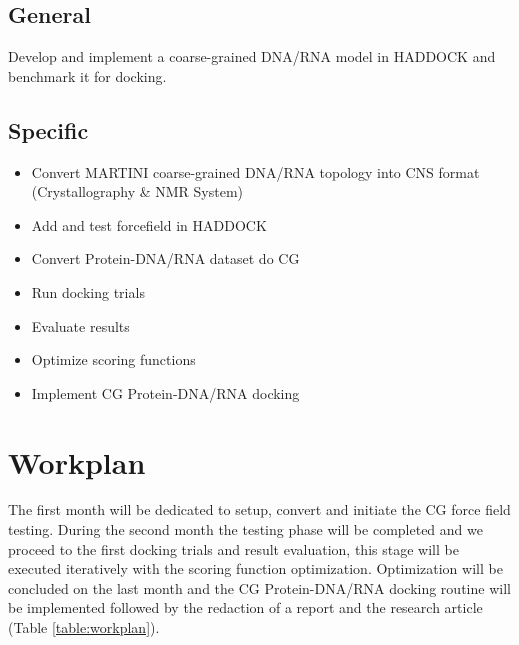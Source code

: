 \documentclass[
	12pt,				%
	openright,			%
	twoside,			%
	a4paper,			%
	english,			%
	french,				%
	spanish,			%
	brazil,				%
	]{abntex2}
\begin{document}
\section{General}
Develop and implement a coarse-grained DNA/RNA model in HADDOCK and benchmark it for docking.
\section{Specific}

\begin{itemize}
	\item Convert MARTINI coarse-grained DNA/RNA topology into CNS format (Crystallography \& NMR System)
	\item Add and test forcefield in HADDOCK
	\item Convert Protein-DNA/RNA dataset do CG
	\item Run docking trials
	\item Evaluate results
	\item Optimize scoring functions
	\item Implement CG Protein-DNA/RNA docking
\end{itemize}

\chapter{Workplan}

The first month will be dedicated to setup, convert and initiate the CG force field testing. During the second month the testing phase will be completed and we proceed to the first docking trials and result evaluation, this stage will be executed iteratively with the scoring function optimization. Optimization will be concluded on the last month and the CG Protein-DNA/RNA docking routine will be implemented followed by the redaction of a report and the research article (Table \ref{table:workplan}).
\\
\\
\\
\end{document}
